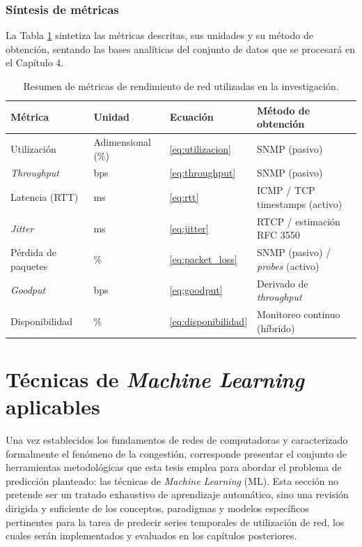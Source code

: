 \documentclass[12pt]{report}
\begin{document}
\subsubsection*{Síntesis de métricas}

La Tabla \ref{tab:metricas_resumen} sintetiza las métricas descritas, sus unidades y su método de obtención, sentando las bases analíticas del conjunto de datos que se procesará en el Capítulo 4.

\begin{table}[H]
    \centering
    \begin{tabular}{|l|l|l|l|}
        \hline
        \textbf{Métrica} & \textbf{Unidad} & \textbf{Ecuación} & \textbf{Método de obtención} \\
        \hline
        Utilización & Adimensional (\%) & \ref{eq:utilizacion} & SNMP (pasivo) \\
        \textit{Throughput} & bps & \ref{eq:throughput} & SNMP (pasivo) \\
        Latencia (RTT) & ms & \ref{eq:rtt} & ICMP / TCP timestamps (activo) \\
        \textit{Jitter} & ms & \ref{eq:jitter} & RTCP / estimación RFC 3550 \\
        Pérdida de paquetes & \% & \ref{eq:packet_loss} & SNMP (pasivo) / \textit{probes} (activo) \\
        \textit{Goodput} & bps & \ref{eq:goodput} & Derivado de \textit{throughput} \\
        Disponibilidad & \% & \ref{eq:disponibilidad} & Monitoreo continuo (híbrido) \\
        \hline
    \end{tabular}
    \caption{Resumen de métricas de rendimiento de red utilizadas en la investigación.}
    \label{tab:metricas_resumen}
\end{table}

\section{Técnicas de \textit{Machine Learning} aplicables}
\label{sec:tecnicas_ml}

Una vez establecidos los fundamentos de redes de computadoras y caracterizado formalmente el fenómeno de la congestión, corresponde presentar el conjunto de herramientas metodológicas que esta tesis emplea para abordar el problema de predicción planteado: las técnicas de \textit{Machine Learning} (ML). Esta sección no pretende ser un tratado exhaustivo de aprendizaje automático, sino una revisión dirigida y suficiente de los conceptos, 
paradigmas y modelos específicos pertinentes para la tarea de predecir series temporales de utilización de red, los cuales serán implementados y evaluados en los capítulos posteriores.
\end{document}
